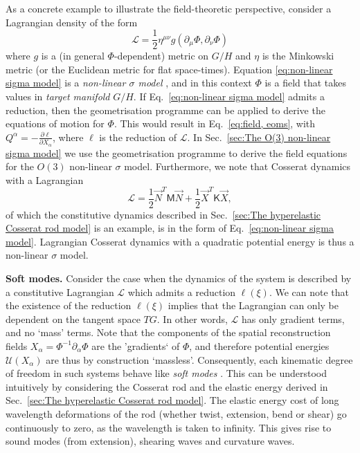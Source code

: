 As a concrete example to illustrate the field-theoretic perspective, consider a Lagrangian density of the form
\begin{equation} \label{eq:non-linear sigma model}
\mathcal{L} = \frac{1}{2}  \eta^{\mu \nu} g( \partial_\mu \Phi, \partial_\nu \Phi) 
\end{equation}
where $g$ is a (in general $\Phi$-dependent) metric on $G/H$ and $\eta$ is the Minkowski metric (or the Euclidean metric for flat space-times). Equation \ref{eq:non-linear sigma model} is a \textit{non-linear $\sigma$ model} \citep{ketovQuantumNonlinearSigmaModels2013, marchettiHydrodynamicsSoftActive2013}, and in this context $\Phi$ is a field that takes values in \textit{target manifold} $G/H$. If Eq.~\ref{eq:non-linear sigma model} admits a reduction, then the geometrisation programme can be applied to derive the equations of motion for $\Phi$. This would result in Eq.~\ref{eq:field, eoms}, with $Q^\alpha = - \frac{\partial \ell}{\partial X_\alpha}$, where $\ell$ is the reduction of $\mathcal{L}$. In Sec.~\ref{sec:The O(3) non-linear sigma model} we use the geometrisation programme to derive the field equations for the $O(3)$ non-linear $\sigma$ model. Furthermore, we note that Cosserat dynamics with a Lagrangian
\begin{equation}
\mathcal{L} = \frac{1}{2} \vec{N}^T \mathsf{M} \vec{N} + \frac{1}{2} \vec{X}^T \mathsf{K} \vec{X},
\end{equation}
of which the constitutive dynamics described in Sec.~\ref{sec:The hyperelastic Cosserat rod model} is an example, is in the form of Eq.~\ref{eq:non-linear sigma model}. Lagrangian Cosserat dynamics with a quadratic potential energy is thus a non-linear $\sigma$ model.

\textbf{Soft modes.} Consider the case when the dynamics of the system is described by a constitutive Lagrangian $\mathcal{L}$ which admits a reduction $\ell (\xi)$. We can note that the existence of the reduction $\ell (\xi)$ implies that the Lagrangian can only be dependent on the tangent space $TG$. In other words, $\mathcal{L}$ has only gradient terms, and no `mass' terms. Note that the components of the spatial reconstruction fields $X_\alpha = \Phi^{-1} \partial_\alpha \Phi$ are the 'gradients` of $\Phi$, and therefore potential energies $\mathcal{U}(X_\alpha)$ are thus by construction `massless'. Consequently, each kinematic degree of freedom in such systems behave like \textit{soft modes} \citep{sethnaOrderParametersBroken2021, chaikinPrinciplesCondensedMatter1995}. This can be understood intuitively by considering the Cosserat rod and the elastic energy derived in Sec.~\ref{sec:The hyperelastic Cosserat rod model}. The elastic energy cost of long wavelength deformations of the rod (whether twist, extension, bend or shear) go continuously to zero, as the wavelength is taken to infinity. This gives rise to sound modes (from extension), shearing waves and curvature waves.

